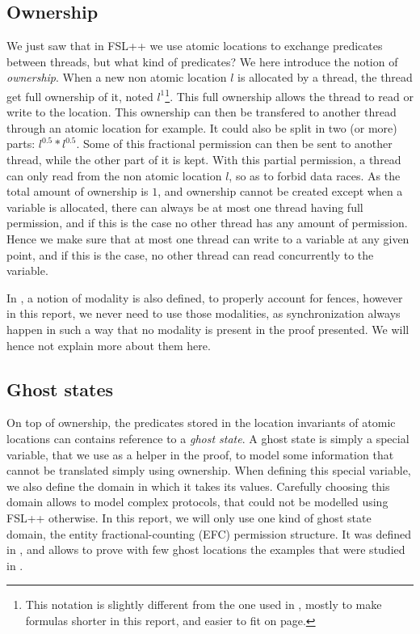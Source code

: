 \subsection{Ownership}
We just saw that in FSL++ we use atomic locations to exchange predicates between threads, but what kind of predicates? We here introduce the notion of \emph{ownership}. When a new non atomic location $l$ is allocated by a thread, the thread get full ownership of it, noted $l^1$\footnote{This notation is slightly different from the one used in \cite{fsl}, mostly to make formulas shorter in this report, and easier to fit on page.}. This full ownership allows the thread to read or write to the location. This ownership can then be transfered to another thread through an atomic location for example. It could also be split in two (or more) parts: $l^{0.5} * l^{0.5}$. Some of this fractional permission can then be sent to another thread, while the other part of it is kept. With this partial permission, a thread can only read from the non atomic location $l$, so as to forbid data races. As the total amount of ownership is $1$, and ownership cannot be created except when a variable is allocated, there can always be at most one thread having full permission, and if this is the case no other thread has any amount of permission. Hence we make sure that at most one thread can write to a variable at any given point, and if this is the case, no other thread can read concurrently to the variable. 

In \cite{fsl}, a notion of modality is also defined, to properly account for fences, however in this report, we never need to use those modalities, as synchronization always happen in such a way that no modality is present in the proof presented. We will hence not explain more about them here.

\subsection{Ghost states}
On top of ownership, the predicates stored in the location invariants of atomic locations can contains reference to a \emph{ghost state}. A ghost state is simply a special variable, that we use as a helper in the proof, to model some information that cannot be translated simply using ownership. When defining this special variable, we also define the domain in which it takes its values. Carefully choosing this domain allows to model complex protocols, that could not be modelled using FSL++ otherwise. In this report, we will only use one kind of ghost state domain, the entity  fractional-counting (EFC) permission structure. It was defined in \cite{gaurav}, and allows to prove with few ghost locations the examples that were studied in \cite{gaurav}.


